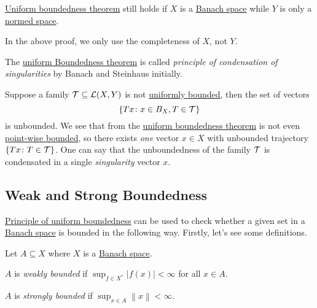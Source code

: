\begin{remark}[Completeness]
	\hyperref[thm:uniform-boundedness]{Uniform boundedness theorem} still holds if \(X\) is a \hyperref[def:Banach-space]{Banach space} while \(Y\) is only a \hyperref[def:normed-vector-space]{normed space}.
\end{remark}
\begin{explanation}
	In the above proof, we only use the completeness of \(X\), not \(Y\).
\end{explanation}

\begin{note}
	The \hyperref[thm:uniform-boundedness]{uniform Boundedness theorem} is called \emph{principle of condensation of singularities} by Banach and Steinhaus initially.
\end{note}
\begin{explanation}
	Suppose a family \(\mathcal{\MakeUppercase{t}} \subseteq \mathcal{\MakeUppercase{l}} (X, Y)\) is not \hyperref[def:uniformly-bounded]{uniformly bounded}, then the set of vectors
	\[
		\left\{ Tx\colon x\in B_X, T\in \mathcal{\MakeUppercase{t}}  \right\}
	\]
	is unbounded. We see that from the \hyperref[thm:uniform-boundedness]{uniform boundedness theorem} is not even \hyperref[def:point-wise-bounded]{point-wise bounded}, so there exists \emph{one} vector \(x\in X\) with unbounded trajectory \(\left\{ Tx\colon T\in \mathcal{\MakeUppercase{t}}  \right\} \). One can say that the unboundedness of the family \(\mathcal{\MakeUppercase{t}} \) is condensated in a single \emph{singularity} vector \(x\).
\end{explanation}

\subsection{Weak and Strong Boundedness}
\hyperref[thm:uniform-boundedness]{Principle of uniform boundedness} can be used to check whether a given set in a \hyperref[def:Banach-space]{Banach space} is bounded in the following way. Firstly, let's see some definitions.

\begin{definition*}
	Let \(A \subseteq X\) where \(X\) is a \hyperref[def:Banach-space]{Banach space}.
	\begin{definition}\label{def:weakly-bounded}
		\(A\) is \emph{weakly bounded} if \(\sup _{f\in X^{\ast} }\left\vert f(x) \right\vert < \infty\) for all \(x\in A\).
	\end{definition}
	\begin{definition}\label{def:strongly-bounded}
		\(A\) is \emph{strongly bounded} if \(\sup _{x\in A}\left\lVert x\right\rVert < \infty\).
	\end{definition}
\end{definition*}

